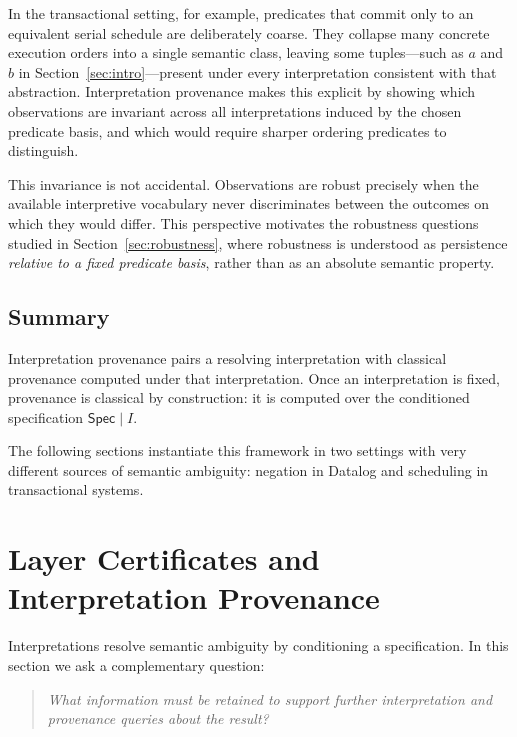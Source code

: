 \documentclass[acmsmall,nonacm]{acmart}
\theoremstyle{remark}
\numberwithin{definition}{section}
\numberwithin{theorem}{section}
\numberwithin{lemma}{section}
\numberwithin{corollary}{section}
\numberwithin{remark}{section}
\numberwithin{example}{section}
\numberwithin{observation}{section}
\numberwithin{assumption}{section}
\newcommand{\Spec}{\mathsf{Spec}}
\begin{document}
In the transactional setting, for example, predicates that commit only to an
equivalent serial schedule are deliberately coarse.
They collapse many concrete execution orders into a single semantic class, leaving
some tuples—such as $a$ and $b$ in Section~\ref{sec:intro}—present under every
interpretation consistent with that abstraction.
Interpretation provenance makes this explicit by showing which observations are
invariant across all interpretations induced by the chosen predicate basis, and
which would require sharper ordering predicates to distinguish.

This invariance is not accidental.
Observations are robust precisely when the available interpretive vocabulary
never discriminates between the outcomes on which they would differ.
This perspective motivates the robustness questions studied in
Section~\ref{sec:robustness}, where robustness is understood as persistence
\emph{relative to a fixed predicate basis}, rather than as an absolute semantic
property.

\subsection{Summary}
Interpretation provenance pairs a resolving interpretation with classical
provenance computed under that interpretation.
Once an interpretation is fixed, provenance is classical by construction: it is
computed over the conditioned specification $\Spec \mid I$.

The following sections instantiate this framework in two settings with very
different sources of semantic ambiguity: negation in Datalog and scheduling in
transactional systems.


\section{Layer Certificates and Interpretation Provenance}
\label{sec:certificates}

Interpretations resolve semantic ambiguity by conditioning a specification.
In this section we ask a complementary question:

\begin{quote}
\emph{What information must be retained to support further interpretation
\emph{and} provenance queries about the result?}
\end{quote}
\end{document}

